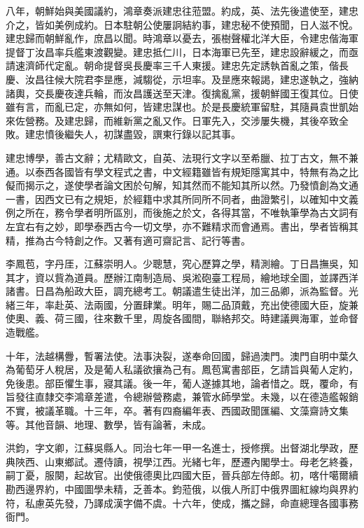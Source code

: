 \begin{pinyinscope}
八年，朝鮮始與美國議約，鴻章奏派建忠往蒞盟。約成，英、法先後遣使至，建忠介之，皆如美例成約。日本駐朝公使屢詗結約事，建忠秘不使預聞，日人滋不悅。建忠歸而朝鮮亂作，庶昌以聞。時鴻章以憂去，張樹聲權北洋大臣，令建忠偕海軍提督丁汝昌率兵艦東渡觀變。建忠抵仁川，日本海軍已先至，建忠設辭緩之，而亟請速濟師代定亂。朝命提督吳長慶率三千人東援。建忠先定誘執首亂之策，偕長慶、汝昌往候大院君李昰應，減騶從，示坦率。及昰應來報謁，建忠遂執之，強納諸輿，交長慶夜達兵輪，而汝昌護送至天津。復擒亂黨，援朝鮮國王復其位。日使雖有言，而亂已定，亦無如何，皆建忠謀也。於是長慶統軍留駐，其隨員袁世凱始來佐營務。及建忠歸，而維新黨之亂又作。日軍先入，交涉屢失機，其後卒致全敗。建忠憤後繼失人，初謀盡毀，譔東行錄以記其事。

建忠博學，善古文辭；尤精歐文，自英、法現行文字以至希臘、拉丁古文，無不兼通。以泰西各國皆有學文程式之書，中文經籍雖皆有規矩隱寓其中，特無有為之比儗而揭示之，遂使學者論文困於句解，知其然而不能知其所以然。乃發憤創為文通一書，因西文已有之規矩，於經籍中求其所同所不同者，曲證繁引，以確知中文義例之所在，務令學者明所區別，而後施之於文，各得其當，不唯執筆學為古文詞有左宜右有之妙，即學泰西古今一切文學，亦不難精求而會通焉。書出，學者皆稱其精，推為古今特創之作。又著有適可齋記言、記行等書。

李鳳苞，字丹厓，江蘇崇明人。少聰慧，究心歷算之學，精測繪。丁日昌撫吳，知其才，資以貲為道員。歷辦江南制造局、吳淞砲臺工程局，繪地球全圖，並譯西洋諸書。日昌為船政大臣，調充總考工。朝議遣生徒出洋，加三品卿，派為監督。光緒三年，率赴英、法兩國，分置肆業。明年，賜二品頂戴，充出使德國大臣，旋兼使奧、義、荷三國，往來數千里，周旋各國間，聯絡邦交。時建議興海軍，並命督造戰艦。

十年，法越構釁，暫署法使。法事決裂，遂奉命回國，歸過澳門。澳門自明中葉久為葡萄牙人稅居，及是葡人私議欲攘為己有。鳳苞寓書部臣，乞請旨與葡人定約，免後患。部臣懼生事，寢其議。後一年，葡人遂據其地，論者惜之。既，覆命，有旨發往直隸交李鴻章差遣，令總辦營務處，兼管水師學堂。未幾，以在德造艦報銷不實，被議革職。十三年，卒。著有四裔編年表、西國政聞匯編、文藻齋詩文集等。其他音韻、地理、數學，皆有論著，未成。

洪鈞，字文卿，江蘇吳縣人。同治七年一甲一名進士，授修撰。出督湖北學政，歷典陜西、山東鄉試。遷侍讀，視學江西。光緒七年，歷遷內閣學士。母老乞終養，嗣丁憂，服闋，起故官。出使俄德奧比四國大臣，晉兵部左侍郎。初，喀什噶爾續勘西邊界約，中國圖學未精，乏善本。鈞蒞俄，以俄人所訂中俄界圖紅線均與界約符，私慮英先發，乃譯成漢字備不虞。十六年，使成，攜之歸，命直總理各國事務衙門。


\end{pinyinscope}
